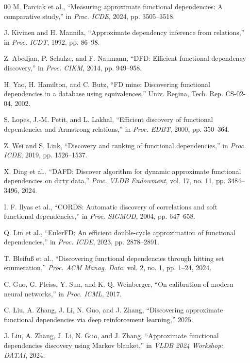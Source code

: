 \documentclass[conference]{IEEEtran}
\begin{document}
\begin{thebibliography}{00}
M. Parciak et al., ``Measuring approximate functional dependencies: A comparative study,'' in \textit{Proc. ICDE}, 2024, pp. 3505--3518.

J. Kivinen and H. Mannila, ``Approximate dependency inference from relations,'' in \textit{Proc. ICDT}, 1992, pp. 86--98.

Z. Abedjan, P. Schulze, and F. Naumann, ``DFD: Efficient functional dependency discovery,'' in \textit{Proc. CIKM}, 2014, pp. 949--958.

H. Yao, H. Hamilton, and C. Butz, ``FD mine: Discovering functional dependencies in a database using equivalences,'' Univ. Regina, Tech. Rep. CS-02-04, 2002.

S. Lopes, J.-M. Petit, and L. Lakhal, ``Efficient discovery of functional dependencies and Armstrong relations,'' in \textit{Proc. EDBT}, 2000, pp. 350--364.

Z. Wei and S. Link, ``Discovery and ranking of functional dependencies,'' in \textit{Proc. ICDE}, 2019, pp. 1526--1537.

X. Ding et al., ``DAFD: Discover algorithm for dynamic approximate functional dependencies on dirty data,'' \textit{Proc. VLDB Endowment}, vol. 17, no. 11, pp. 3484--3496, 2024.

I. F. Ilyas et al., ``CORDS: Automatic discovery of correlations and soft functional dependencies,'' in \textit{Proc. SIGMOD}, 2004, pp. 647--658.

Q. Lin et al., ``EulerFD: An efficient double-cycle approximation of functional dependencies,'' in \textit{Proc. ICDE}, 2023, pp. 2878--2891.

T. Bleifu\ss{} et al., ``Discovering functional dependencies through hitting set enumeration,'' \textit{Proc. ACM Manag. Data}, vol. 2, no. 1, pp. 1--24, 2024.

C. Guo, G. Pleiss, Y. Sun, and K. Q. Weinberger, ``On calibration of modern neural networks,'' in \textit{Proc. ICML}, 2017.

C. Liu, A. Zhang, J. Li, N. Guo, and J. Zhang, ``Discovering approximate functional dependencies via deep reinforcement learning,'' 2025.

J. Liu, A. Zhang, J. Li, N. Guo, and J. Zhang, ``Approximate functional dependencies discovery using Markov blanket,'' in \textit{VLDB 2024 Workshop: DATAI}, 2024.

\end{thebibliography}
\end{document}
